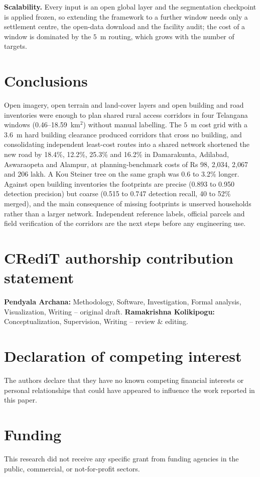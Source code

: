 \documentclass[preprint,12pt]{elsarticle}
\begin{document}
\textbf{Scalability.} Every input is an open global layer and the segmentation checkpoint is applied frozen, so extending the framework to a further window needs only a settlement centre, the open-data download and the facility audit; the cost of a window is dominated by the $5$~m routing, which grows with the number of targets.

\section{Conclusions}
Open imagery, open terrain and land-cover layers and open building and road inventories were enough to plan shared rural access corridors in four Telangana windows (0.46--18.59~km$^2$) without manual labelling. The $5$~m cost grid with a $3.6$~m hard building clearance produced corridors that cross no building, and consolidating independent least-cost routes into a shared network shortened the new road by 18.4\%, 12.2\%, 25.3\% and 16.2\% in Damarakunta, Adilabad, Aswaraopeta and Alampur, at planning-benchmark costs of Rs 98, 2{,}034, 2{,}067 and 206 lakh. A Kou Steiner tree on the same graph was 0.6 to 3.2\% longer. Against open building inventories the footprints are precise (0.893 to 0.950 detection precision) but coarse (0.515 to 0.747 detection recall, 40 to 52\% merged), and the main consequence of missing footprints is unserved households rather than a larger network. Independent reference labels, official parcels and field verification of the corridors are the next steps before any engineering use.

\section*{CRediT authorship contribution statement}
\textbf{Pendyala Archana:} Methodology, Software, Investigation, Formal analysis, Visualization, Writing -- original draft. \textbf{Ramakrishna Kolikipogu:} Conceptualization, Supervision, Writing -- review \& editing.

\section*{Declaration of competing interest}
The authors declare that they have no known competing financial interests or personal relationships that could have appeared to influence the work reported in this paper.

\section*{Funding}
This research did not receive any specific grant from funding agencies in the public, commercial, or not-for-profit sectors.
\end{document}
